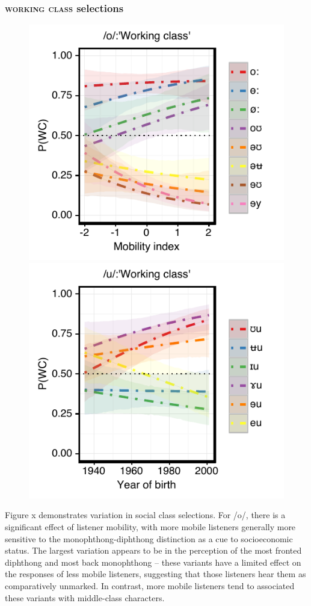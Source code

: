 \documentclass[PWPL]{article}
\begin{document}
\subsubsection{\textsc{working class} selections}
\begin{figure}[ht]
\centering
\includegraphics[scale=0.8]{ow_class_dim3.pdf}
\includegraphics[scale=0.8]{uw_class_age.pdf}
\end{figure}
Figure x demonstrates variation in social class selections. For /o/, there is a significant effect of listener mobility, with more mobile listeners generally more sensitive to the monophthong-diphthong distinction as a cue to socioeconomic status. The largest variation appears to be in the perception of the most fronted diphthong and most back monophthong -- these variants have a limited effect on the responses of less mobile listeners, suggesting that those listeners hear them as comparatively unmarked. In contrast, more mobile listeners tend to associated these variants with middle-class characters.
\end{document}
